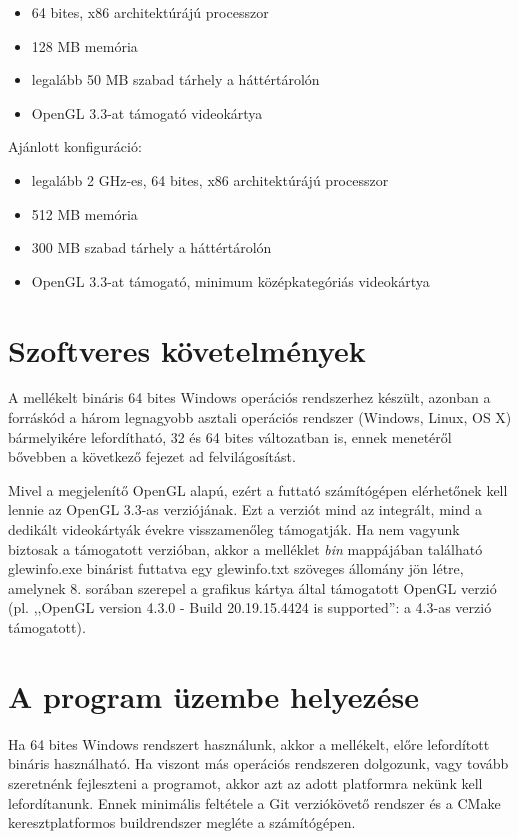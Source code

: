 \begin{itemize}
  \item 64 bites, x86 architektúrájú processzor
  \item 128 MB memória
  \item legalább 50 MB szabad tárhely a háttértárolón
  \item OpenGL 3.3-at támogató videokártya
\end{itemize}

\noindent
Ajánlott konfiguráció:

\begin{itemize}
  \item legalább 2 GHz-es, 64 bites, x86 architektúrájú processzor
  \item 512 MB memória
  \item 300 MB szabad tárhely a háttértárolón
  \item OpenGL 3.3-at támogató, minimum középkategóriás videokártya
\end{itemize}

\section{Szoftveres követelmények}

A mellékelt bináris 64 bites Windows operációs rendszerhez készült, azonban a forráskód a három legnagyobb asztali operációs rendszer (Windows, Linux, OS X) bármelyikére lefordítható, 32 és 64 bites változatban is, ennek menetéről bővebben a következő fejezet ad felvilágosítást.

Mivel a megjelenítő OpenGL alapú, ezért a futtató számítógépen elérhetőnek kell lennie az OpenGL 3.3-as verziójának. Ezt a verziót mind az integrált, mind a dedikált videokártyák évekre visszamenőleg támogatják. Ha nem vagyunk biztosak a támogatott verzióban, akkor a melléklet \textit{bin} mappájában található glewinfo.exe binárist futtatva egy glewinfo.txt szöveges állomány jön létre, amelynek 8. sorában szerepel a grafikus kártya által támogatott OpenGL verzió (pl. ,,OpenGL version 4.3.0 - Build 20.19.15.4424 is supported'': a 4.3-as verzió támogatott).

\section{A program üzembe helyezése}

Ha 64 bites Windows rendszert használunk, akkor a mellékelt, előre lefordított bináris használható. Ha viszont más operációs rendszeren dolgozunk, vagy tovább szeretnénk fejleszteni a programot, akkor azt az adott platformra nekünk kell lefordítanunk. Ennek minimális feltétele a Git verziókövető rendszer és a CMake keresztplatformos buildrendszer megléte a számítógépen.

